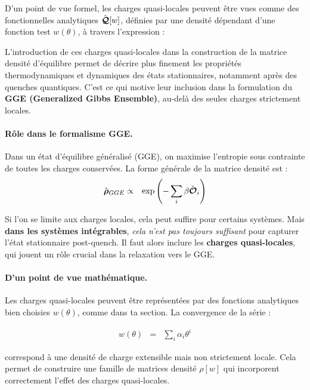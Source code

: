 D’un point de vue formel, les charges quasi-locales peuvent être vues comme des fonctionnelles analytiques $\hat{\bm{\mathcal{Q}}}[w]$, définies par une densité dépendant d’une fonction test $w(\theta)$, à travers l’expression :


L’introduction de ces charges quasi-locales dans la construction de la matrice densité d’équilibre permet de décrire plus finement les propriétés thermodynamiques et dynamiques des états stationnaires, notamment après des quenches quantiques. C’est ce qui motive leur inclusion dans la formulation du {\bf GGE (Generalized Gibbs Ensemble)}, au-delà des seules charges strictement locales.

\paragraph{Rôle dans le formalisme GGE.}
Dans un état d'équilibre généralisé (GGE), on maximise l'entropie sous contrainte de toutes les charges conservées. La forme générale de la matrice densité est :
\begin{eqnarray*}
	\hat{\bm{\rho}}_{GGE} & \propto & \exp \left (- \sum_i \beta \hat{\bm{\mathcal{O}}}_i  \right) 	
\end{eqnarray*}

Si l’on se limite aux charges locales, cela peut suffire pour certains systèmes. Mais {\bf dans les systèmes intégrables}, {\em cela n’est pas toujours suffisant} pour capturer l'état stationnaire post-quench. Il faut alors inclure les {\bf charges quasi-locales}, qui jouent un rôle crucial dans la relaxation vers le GGE.

\paragraph{D’un point de vue mathématique.} 
Les charges quasi-locales peuvent être représentées par des fonctions analytiques bien choisies $w(\theta)$, comme dans ta section. La convergence de la série :

\begin{eqnarray*}
	w(\theta) & = & \sum_i \alpha_i \theta^i 		
\end{eqnarray*}


correspond à une densité de charge extensible mais non strictement locale. Cela permet de construire une famille de matrices densité $\rho[w]$ qui incorporent correctement l'effet des charges quasi-locales.
